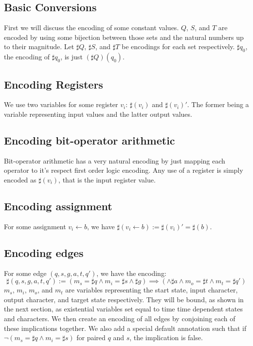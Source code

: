 \documentclass{article}
\newcommand{\from}{\leftarrow}
\newcommand{\enc}{\sharp}
\theoremstyle{definition}
\begin{document}
\subsection{Basic Conversions}
First we will discuss the encoding of some constant values.
$Q$, $S$, and $T$ are encoded by using some bijection between those sets and the natural numbers up to their magnitude.
Let $\enc Q$, $\enc S$, and $\enc T$ be encodings for each set respectively.
$\enc q_0$, the encoding of $\enc q_0$, is just $(\enc Q) (q_0)$.

\subsection{Encoding Registers}
We use two variables for some register $v_i$: $\enc (v_i)$ and $\enc (v_i)'$.
The former being a variable representing input values and the latter output values.

\subsection{Encoding bit-operator arithmetic}
Bit-operator arithmetic has a very natural encoding by just mapping each operator to it's respect first order logic encoding.
Any use of a register is simply encoded as $\enc (v_i)$, that is the input register value.

\subsection{Encoding assignment}
For some assignment $v_i \from b$, we have $\enc (v_i \from b) := \enc (v_i)' = \enc (b)$.

\subsection{Encoding edges}
For some edge $(q, s, g, a, t, q')$,
we have the encoding:
$$\enc (q, s, g, a, t, q') := (m_s = \enc q \wedge m_i = \enc s \wedge \enc g ) \implies ( \wedge \enc a \wedge m_o = \enc t \wedge m_t = \enc q')$$
$m_s$, $m_i$, $m_o$, and $m_t$ are variables representing the start state, input character, output character, and target state respectively.
They will be bound, as shown in the next section, as existential variables set equal to time time dependent states and characters.
We then create an encoding of all edges by conjoining each of these implications together.
We also add a special default annotation such that if $\neg (m_s = \enc q \wedge m_i = \enc s)$ for paired $q$ and $s$,
the implication is false.
\end{document}
